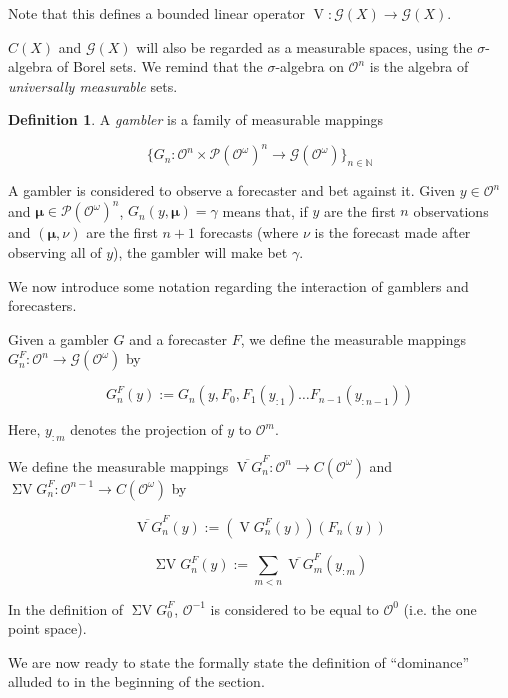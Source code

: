\documentclass[11pt]{article}
\theoremstyle{definition}
\newtheorem{definition}{Definition}%
\theoremstyle{plain}
\newcommand{\Nats}{\mathbb{N}}
\newcommand{\Sq}[2]{\{#1\}_{#2 \in \Nats}}
\newcommand{\Sqn}[1]{\Sq{#1}{n}}
\newcommand{\PM}{\mathcal{P}}
\newcommand{\Ob}{\mathcal{O}}
\newcommand{\OO}{\Ob^\omega}
\newcommand{\PMO}{\PM(\OO)}
\newcommand{\Gm}{\mathcal{G}}
\newcommand{\GMO}{\Gm(\OO)}
\newcommand{\CO}{C(\OO)}
\DeclareMathOperator{\V}{V}
\DeclareMathOperator{\SV}{\Sigma V}
\newcommand{\BM}{\bm{\mu}}
\begin{document}
Note that this defines a bounded linear operator $\V: \Gm(X) \rightarrow \Gm(X)$.

$C(X)$ and $\Gm(X)$ will also be regarded as a measurable spaces, using the $\sigma$-algebra of Borel sets. We remind that the $\sigma$-algebra on $\Ob^n$ is the algebra of \emph{universally measurable} sets.

\begin{definition}

A \emph{gambler} is a family of measurable mappings

\[\Sqn{G_n : \Ob^n \times \PMO^n \rightarrow \Gm(\OO)}\]

\end{definition}

A gambler is considered to observe a forecaster and bet against it. Given $y \in \Ob^n$ and $\BM \in \PMO^n$, $G_n(y,\BM)=\gamma$ means that, if $y$ are the first $n$ observations and $(\BM,\nu)$ are the first $n + 1$ forecasts (where $\nu$ is the forecast made after observing all of $y$), the gambler will make bet $\gamma$.

We now introduce some notation regarding the interaction of gamblers and forecasters. 

Given a gambler $G$ and a forecaster $F$, we define the measurable mappings $G^F_n: \Ob^n \rightarrow \GMO$ by

\begin{equation}
\label{eqn:GF}
G^F_n(y):=G_n(y,F_0,F_1(y_{:1}) \ldots F_{n-1}(y_{:n-1}))
\end{equation}

Here, $y_{:m}$ denotes the projection of $y$ to $\Ob^m$.

We define the measurable mappings $\overline{\V G}^F_n: \Ob^n \rightarrow \CO$ and $\SV G^F_n: \Ob^{n-1} \rightarrow \CO$ by

\begin{equation}
\overline{\V G}^F_n(y):=(\V G^F_n(y))(F_n(y))
\end{equation}

\begin{equation}
\SV G^F_n(y) := \sum_{m < n} \overline{\V G}^F_m(y_{:m})
\end{equation}

In the definition of $\SV G^F_0$, $\Ob^{-1}$ is considered to be equal to $\Ob^0$ (i.e. the one point space).

We are now ready to state the formally state the definition of \enquote{dominance} alluded to in the beginning of the section.
\end{document}
